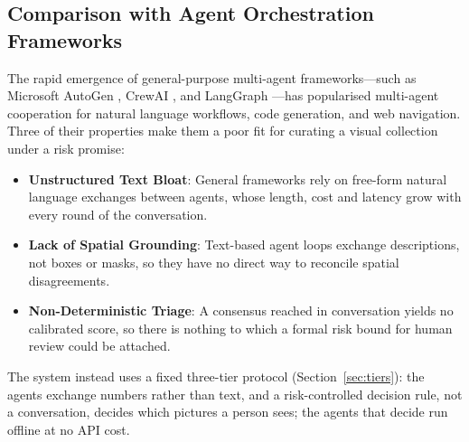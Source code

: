 \documentclass[12pt,a4paper]{report}
\begin{document}
\subsection{Comparison with Agent Orchestration Frameworks}
The rapid emergence of general-purpose multi-agent frameworks---such as Microsoft AutoGen \cite{autogen2024}, CrewAI \cite{crewai}, and LangGraph \cite{langgraph}---has popularised multi-agent cooperation for natural language workflows, code generation, and web navigation. Three of their properties make them a poor fit for curating a visual collection under a risk promise:
\begin{itemize}
    \item \textbf{Unstructured Text Bloat}: General frameworks rely on free-form natural language exchanges between agents, whose length, cost and latency grow with every round of the conversation.
    \item \textbf{Lack of Spatial Grounding}: Text-based agent loops exchange descriptions, not boxes or masks, so they have no direct way to reconcile spatial disagreements.
    \item \textbf{Non-Deterministic Triage}: A consensus reached in conversation yields no calibrated score, so there is nothing to which a formal risk bound for human review could be attached.
\end{itemize}
The system instead uses a fixed three-tier protocol (Section~\ref{sec:tiers}): the agents exchange numbers rather than text, and a risk-controlled decision rule, not a conversation, decides which pictures a person sees; the agents that decide run offline at no API cost.
\end{document}
